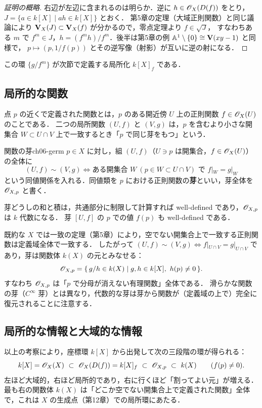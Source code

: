 \begin{proof}[証明の概略]
右辺が左辺に含まれるのは明らか．逆に $h\in\mathscr{O}_X(D(f))$ をとり，$J=\{a\in k[X]\mid ah\in k[X]\}$ とおく．
第5章の定理（大域正則関数）と同じ議論により $\mathbf{V}_X(J)\subset\mathbf{V}_X(f)$ が分かるので，零点定理より $f\in\sqrt J$，
すなわちある $m$ で $f^m\in J$，$h=(f^mh)/f^m$．後半は第5章の例 $\mathbb{A}^1\setminus\{0\}\cong\mathbf{V}(xy-1)$ と同様で，
$p\mapsto(p,1/f(p))$ とその逆写像（射影）が互いに逆の射になる．
\end{proof}

この環 $\{g/f^m\}$ が次節で定義する局所化 $k[X]_f$ である．

\subsection{局所的な関数}
\label{subsec:ch06-germ}

点 $p$ の近くで定義された関数とは，$p$ のある開近傍 $U$ 上の正則関数 $f\in\mathscr{O}_X(U)$ のことである．
二つの局所関数 $(U,f)$ と $(V,g)$ は，$p$ を含むより小さな開集合 $W\subset U\cap V$ 上で一致するとき「$p$ で同じ芽をもつ」という．

\begin{mydef}{関数の芽}{ch06-germ}
$p\in X$ に対し，組 $(U,f)$（$U\ni p$ は開集合，$f\in\mathscr{O}_X(U)$）の全体に
\[
  (U,f)\sim(V,g)\iff \text{ある開集合 } W\ (p\in W\subset U\cap V) \text{ で } f|_W=g|_W
\]
という同値関係を入れる．同値類を $p$ における正則関数の\textbf{芽}といい，芽全体を $\mathscr{O}_{X,p}$ と書く．
\end{mydef}

芽どうしの和と積は，共通部分に制限して計算すれば well-defined であり，$\mathscr{O}_{X,p}$ は $k$ 代数になる．
芽 $[U,f]$ の $p$ での値 $f(p)$ も well-defined である．

既約な $X$ では一致の定理（第5章）により，空でない開集合上で一致する正則関数は定義域全体で一致する．
したがって $(U,f)\sim(V,g)\iff f|_{U\cap V}=g|_{U\cap V}$ であり，芽は関数体 $k(X)$ の元とみなせる：
\[
  \mathscr{O}_{X,p}=\{\,g/h\in k(X)\mid g,h\in k[X],\ h(p)\neq0\,\}.
\]
すなわち $\mathscr{O}_{X,p}$ は「$p$ で分母が消えない有理関数」全体である．
滑らかな関数の芽（$C^\infty$ 芽）とは異なり，代数的な芽は芽から関数が（定義域の上で）完全に復元されることに注意する．

\subsection{局所的な情報と大域的な情報}

以上の考察により，座標環 $k[X]$ から出発して次の三段階の環が得られる：
\[
  k[X]=\OO_X(X)\ \subset\ \OO_X(D(f))=k[X]_f\ \subset\ \OO_{X,p}\ \subset\ k(X)\qquad(f(p)\neq0).
\]
左ほど大域的，右ほど局所的であり，右に行くほど「割ってよい元」が増える．
最も右の関数体 $k(X)$ は「どこか空でない開集合上で定義された関数」全体で，これは $X$ の生成点（第12章）での局所環にあたる．

